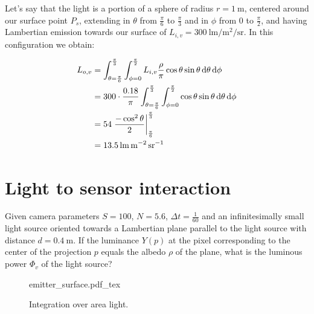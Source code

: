 Let's say that the light is a portion of a sphere of radius $r = \SI{1}{\meter}$, centered
around our surface point $P_s$, extending in $\theta$ from $\frac\pi6$ to $\frac\pi3$ and in
$\phi$ from $0$ to $\frac\pi2$, and having Lambertian emission towards our
surface of $L_{i,v} = \SI{300}{\lumen\per\square\meter\per\steradian}$.
In this configuration we obtain:

\begin{align*}
L_{o,v} &= \int_{\theta = \frac\pi 6}^\frac\pi 3 \int _{\phi = 0}^\frac\pi
2 L_{i,v} \frac\rho\pi \cos\theta \sin\theta \d\theta \d\phi \\
             &= 300\cdot \frac{0.18}\pi \int_{\theta = \frac\pi 6}^\frac\pi 3 \int _{\phi = 0}^\frac\pi 2 \cos\theta \sin\theta \d\theta \d\phi \\
             &= 54 \left.\frac{-\cos^2\theta}{2}\right|_{\frac\pi 6}^\frac\pi 3 \\
             &= \SI{13.5}{\lumen\per\square\meter\per\steradian}
\end{align*}

\section{Light to sensor interaction}

Given camera parameters $S=100$, $N=5.6$, $\Delta t = \frac 1 {60}$
and an infinitesimally small light source oriented towards a
Lambertian plane parallel to the light source with distance
$d = \SI{0.4}{\meter}$. If the luminance $Y(p)$ at the pixel corresponding
to the center of the projection $p$ equals the albedo $\rho$ of the plane,
what is the luminous power $\Phi_v$ of the light source?
\begin{figure}[t]
    \centering
    \def\svgwidth{0.9\linewidth}
    {emitter_surface.pdf_tex}
    \caption{Integration over area light.}
\end{figure}

